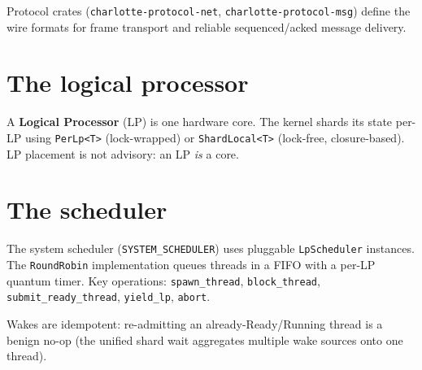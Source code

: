 Protocol crates (\texttt{charlotte-protocol-net},
\texttt{charlotte-protocol-msg}) define the wire formats for frame transport and
reliable sequenced/acked message delivery.

\section{The logical processor}

A \textbf{Logical Processor} (LP) is one hardware core. The kernel shards its
state per-LP using \texttt{PerLp<T>} (lock-wrapped) or
\texttt{ShardLocal<T>} (lock-free, closure-based). LP placement is not advisory:
an LP \emph{is} a core.

\section{The scheduler}

The system scheduler (\texttt{SYSTEM\_SCHEDULER}) uses pluggable
\texttt{LpScheduler} instances. The \texttt{RoundRobin} implementation queues
threads in a FIFO with a per-LP quantum timer. Key operations:
\texttt{spawn\_thread}, \texttt{block\_thread}, \texttt{submit\_ready\_thread},
\texttt{yield\_lp}, \texttt{abort}.

Wakes are idempotent: re-admitting an already-Ready/Running thread is a benign
no-op (the unified shard wait aggregates multiple wake sources onto one thread).

\endinput
